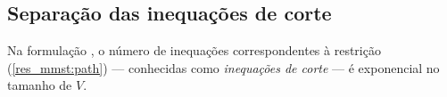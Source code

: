 





\subsection{Separação das inequações de corte}
\label{sec:separacao}

Na formulação \PGtrestricoes, %
o número de inequações correspondentes à 
restrição (\ref{res_mmst:path}) --- conhecidas como 
\emph{inequações de corte} ---  é exponencial no tamanho de $V$. 
%

